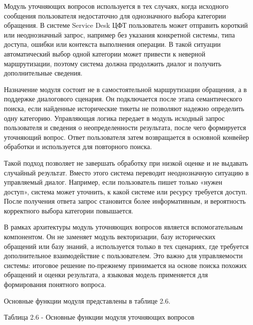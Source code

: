 \documentclass[14pt,a4paper]{extarticle}
\renewcommand{\textbf}[1]{#1}
\numberwithin{figure}{section}
\numberwithin{table}{section}
\begin{document}
Модуль уточняющих вопросов используется в тех случаях, когда исходного
сообщения пользователя недостаточно для однозначного выбора категории
обращения. В системе Service Desk ЦФТ пользователь может отправить
короткий или неоднозначный запрос, например без указания конкретной
системы, типа доступа, ошибки или контекста выполнения операции. В такой
ситуации автоматический выбор одной категории может привести к неверной
маршрутизации, поэтому система должна продолжить диалог и получить
дополнительные сведения.

Назначение модуля состоит не в самостоятельной маршрутизации обращения,
а в поддержке диалогового сценария. Он подключается после этапа
семантического поиска, если найденные исторические тикеты не позволяют
надежно определить одну категорию. Управляющая логика передает в модуль
исходный запрос пользователя и сведения о неопределенности результата,
после чего формируется уточняющий вопрос. Ответ пользователя затем
возвращается в основной конвейер обработки и используется для повторного
поиска.

Такой подход позволяет не завершать обработку при низкой оценке и
не выдавать случайный результат. Вместо этого система переводит
неоднозначную ситуацию в управляемый диалог. Например, если пользователь
пишет только «нужен доступ», система может уточнить, к какой системе или
ресурсу требуется доступ. После получения ответа запрос становится более
информативным, и вероятность корректного выбора категории повышается.

В рамках архитектуры модуль уточняющих вопросов является вспомогательным
компонентом. Он не заменяет модуль векторизации, базу исторических
обращений или базу знаний, а используется только в тех сценариях, где
требуется дополнительное взаимодействие с пользователем. Это важно для
управляемости системы: итоговое решение по-прежнему принимается на
основе поиска похожих обращений и оценки результата, а языковая модель
применяется для формирования понятного вопроса.

Основные функции модуля представлены в таблице 2.6.

\textbf{Таблица 2.6 - Основные функции модуля уточняющих вопросов}
\end{document}
